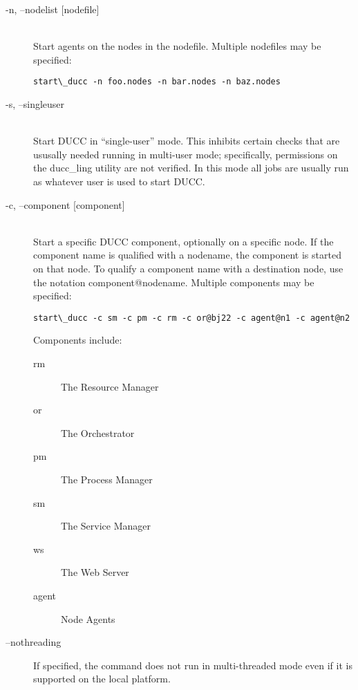       \begin{description}

        \item[-n, --nodelist {[nodefile] }] \hfill \\
          Start agents on the nodes in the nodefile. Multiple nodefiles may be specified: 
\begin{verbatim}
start\_ducc -n foo.nodes -n bar.nodes -n baz.nodes 
\end{verbatim}
          

        \item[-s, --singleuser] \hfill \\
          Start DUCC in ``single-user'' mode.  This inhibits certain checks that are ususally
          needed running in multi-user mode; specifically, permissions on the ducc\_ling
          utility are not verified.  In this mode all jobs are usually run as whatever user is used
          to start DUCC.

        \item[-c, --component {[component] }] \hfill \\
          Start a specific DUCC component, optionally on a specific node. If the component 
          name is qualified with a nodename, the component is started on that node. To qualify 
          a component name with a destination node, use the notation component@nodename. 
          Multiple components may be specified: 
\begin{verbatim}
start\_ducc -c sm -c pm -c rm -c or@bj22 -c agent@n1 -c agent@n2 
\end{verbatim}
          
          Components include: 
          \begin{description}
            \item[rm] The Resource Manager
            \item[or]The Orchestrator
            \item[pm]The Process Manager
            \item[sm]The Service Manager
            \item[ws]The Web Server
            \item[agent]Node Agents
          \end{description}

          \item[--nothreading] If specified, the command does not run in multi-threaded mode
            even if it is supported on the local platform.

      \end{description}

